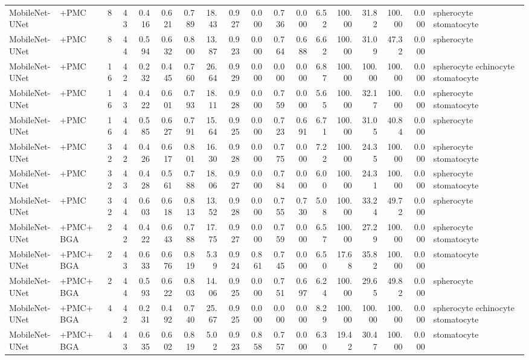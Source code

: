 \documentclass[10pt]{article}
\begin{document}
\begin{landscape}
{\begin{longtable}{l l r r r r r r r r r r r r r r r l}
MobileNet-UNet & +PMC & 8 & 43 & 0.416 & 0.621 & 0.789 & 18.43 & 0.927 & 0.000 & 0.736 & 0.000 & 6.52 & 100.00 & 31.82 & 100.00 & 0.000 & spherocyte stomatocyte \\
MobileNet-UNet & +PMC & 8 & 44 & 0.594 & 0.632 & 0.800 & 13.87 & 0.923 & 0.000 & 0.764 & 0.688 & 6.62 & 100.00 & 31.09 & 47.32 & 0.000 & spherocyte \\
MobileNet-UNet & +PMC & 16 & 42 & 0.232 & 0.445 & 0.760 & 26.64 & 0.929 & 0.000 & 0.000 & 0.000 & 6.87 & 100.00 & 100.00 & 100.00 & 0.000 & spherocyte echinocyte stomatocyte \\
MobileNet-UNet & +PMC & 16 & 43 & 0.422 & 0.601 & 0.793 & 18.11 & 0.928 & 0.000 & 0.759 & 0.000 & 5.65 & 100.00 & 32.17 & 100.00 & 0.000 & spherocyte stomatocyte \\
MobileNet-UNet & +PMC & 16 & 44 & 0.585 & 0.627 & 0.791 & 15.64 & 0.925 & 0.000 & 0.723 & 0.691 & 6.71 & 100.00 & 31.05 & 40.84 & 0.000 & spherocyte \\
MobileNet-UNet & +PMC & 32 & 42 & 0.426 & 0.617 & 0.801 & 16.30 & 0.928 & 0.000 & 0.775 & 0.000 & 7.22 & 100.00 & 24.35 & 100.00 & 0.000 & spherocyte stomatocyte \\
MobileNet-UNet & +PMC & 32 & 43 & 0.428 & 0.561 & 0.788 & 18.06 & 0.927 & 0.000 & 0.784 & 0.000 & 6.00 & 100.00 & 24.31 & 100.00 & 0.000 & spherocyte stomatocyte \\
MobileNet-UNet & +PMC & 32 & 44 & 0.603 & 0.618 & 0.813 & 13.52 & 0.928 & 0.000 & 0.755 & 0.730 & 5.08 & 100.00 & 33.24 & 49.72 & 0.000 & spherocyte \\
MobileNet-UNet & +PMC+BGA & 2 & 42 & 0.422 & 0.643 & 0.788 & 17.75 & 0.927 & 0.000 & 0.759 & 0.000 & 6.57 & 100.00 & 27.29 & 100.00 & 0.000 & spherocyte stomatocyte \\
MobileNet-UNet & +PMC+BGA & 2 & 43 & 0.633 & 0.676 & 0.819 & 5.39 & 0.924 & 0.861 & 0.745 & 0.000 & 6.50 & 17.68 & 35.82 & 100.00 & 0.000 & stomatocyte \\
MobileNet-UNet & +PMC+BGA & 2 & 44 & 0.593 & 0.622 & 0.803 & 14.06 & 0.925 & 0.000 & 0.751 & 0.697 & 6.24 & 100.00 & 29.65 & 49.82 & 0.000 & spherocyte \\
MobileNet-UNet & +PMC+BGA & 4 & 42 & 0.231 & 0.492 & 0.740 & 25.67 & 0.925 & 0.000 & 0.000 & 0.000 & 8.29 & 100.00 & 100.00 & 100.00 & 0.000 & spherocyte echinocyte stomatocyte \\
MobileNet-UNet & +PMC+BGA & 4 & 43 & 0.635 & 0.602 & 0.819 & 5.02 & 0.923 & 0.858 & 0.757 & 0.000 & 6.30 & 19.42 & 30.47 & 100.00 & 0.000 & stomatocyte \\

\end{longtable}}
\end{landscape}
\end{document}
